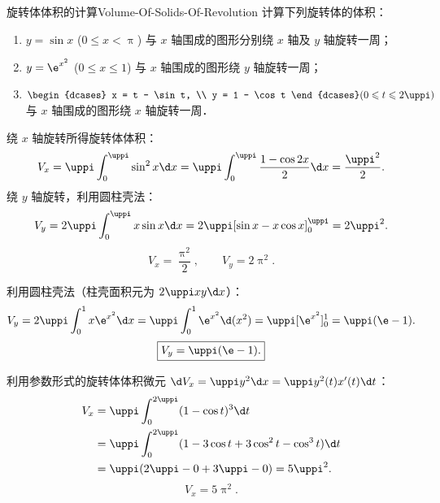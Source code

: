 \begin{problem}{旋转体体积的计算}{Volume-Of-Solids-Of-Revolution}
    计算下列旋转体的体积：
    \begin{enumerate}
        \item $y = \sin x$ ($0 \leqslant x < \uppi$) 与 $x$ 轴围成的图形分别绕 $x$ 轴及 $y$ 轴旋转一周；
        \item $y = \e^{x^2}$ ($0 \leqslant x \leqslant 1$) 与 $x$ 轴围成的图形绕 $y$ 轴旋转一周；
        \item $\begin{dcases} x = t - \sin t, \\ y = 1 - \cos t \end{dcases} (0 \leqslant t \leqslant 2\uppi)$ 与 $x$ 轴围成的图形绕 $x$ 轴旋转一周．
    \end{enumerate}
\end{problem}

\begin{solution}

    绕 $x$ 轴旋转所得旋转体体积：
    \begin{equation}
        V_x = \uppi \int_0^{\uppi} \sin^2 x \d x = \uppi \int_0^{\uppi} \frac{1 - \cos 2x}{2}\d x = \frac{\uppi^2}{2}.
    \end{equation}
    绕 $y$ 轴旋转，利用圆柱壳法：
    \begin{equation}
        V_y = 2\uppi \int_0^{\uppi} x \sin x \d x = 2\uppi [\sin x - x\cos x]_0^{\uppi} = 2\uppi^2.
    \end{equation}
    \begin{equation}
        \boxed{V_x = \frac{\uppi^2}{2}, \qquad V_y = 2\uppi^2.}
    \end{equation}


    利用圆柱壳法（柱壳面积元为 $2\uppi x y \d x$）：
    \begin{equation}
        V_y = 2\uppi \int_0^1 x \e^{x^2}\d x = \uppi \int_0^1 \e^{x^2}\d(x^2) = \uppi [\e^{x^2}]_0^1 = \uppi(\e - 1).
    \end{equation}
    \begin{equation}
        \boxed{V_y = \uppi(\e - 1).}
    \end{equation}


    利用参数形式的旋转体体积微元 $\d V_x = \uppi y^2 \d x = \uppi y^2(t) x'(t)\d t$：
    \begin{equation}
        \begin{aligned}
            V_x & = \uppi \int_0^{2\uppi} (1 - \cos t)^3 \d t                      \\
                & = \uppi \int_0^{2\uppi} (1 - 3\cos t + 3\cos^2 t - \cos^3 t)\d t \\
                & = \uppi (2\uppi - 0 + 3\uppi - 0) = 5\uppi^2.
        \end{aligned}
    \end{equation}
    \begin{equation}
        \boxed{V_x = 5\uppi^2.}
    \end{equation}
\end{solution}

